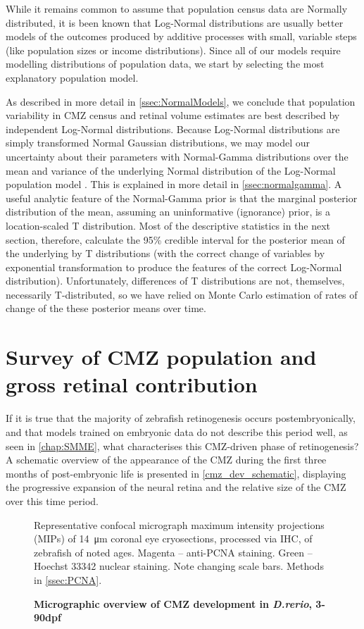 While it remains common to assume that population census data are Normally distributed, it is been known \cite{Heath1967} that Log-Normal distributions are usually better models of the outcomes produced by additive processes with small, variable steps (like population sizes or income distributions). Since all of our models require modelling distributions of population data, we start by selecting the most explanatory population model.

As described in more detail in \autoref{ssec:NormalModels}, we conclude that population variability in CMZ census and retinal volume estimates are best described by independent Log-Normal distributions. Because Log-Normal distributions are simply transformed Normal Gaussian distributions, we may model our uncertainty about their parameters with Normal-Gamma distributions over the mean and variance of the underlying Normal distribution of the Log-Normal population model \cite{Murphy2007}. This is explained in more detail in \autoref{ssec:normalgamma}. A useful analytic feature of the Normal-Gamma prior is that the marginal posterior distribution of the mean, assuming an uninformative (ignorance) prior, is a location-scaled T distribution. Most of the descriptive statistics in the next section, therefore, calculate the 95\% credible interval for the posterior mean of the underlying by T distributions (with the correct change of variables by exponential transformation to produce the features of the correct Log-Normal distribution). Unfortunately, differences of T distributions are not, themselves, necessarily T-distributed, so we have relied on Monte Carlo estimation of rates of change of the these posterior means over time. 

\section{Survey of CMZ population and gross retinal contribution}

If it is true that the majority of zebrafish retinogenesis occurs postembryonically, and that models trained on embryonic data do not describe this period well, as seen in \autoref{chap:SMME}, what characterises this CMZ-driven phase of retinogenesis? A schematic overview of the appearance of the CMZ during the first three months of post-embryonic life is presented in \autoref{cmz_dev_schematic}, displaying the progressive expansion of the neural retina and the relative size of the CMZ over this time period.

\begin{figure}[!h]
    \caption{{\bf Micrographic overview of CMZ development in \textit{D.rerio}, 3-90dpf}}
    Representative confocal micrograph maximum intensity projections (MIPs) of \SI{14}{\micro\metre} coronal eye cryosections, processed via IHC, of zebrafish of noted ages. Magenta – anti-PCNA staining. Green – Hoechst 33342 nuclear staining. Note changing scale bars.
    \label{cmz_dev_schematic}
    Methods in \autoref{ssec:PCNA}.
\end{figure}

